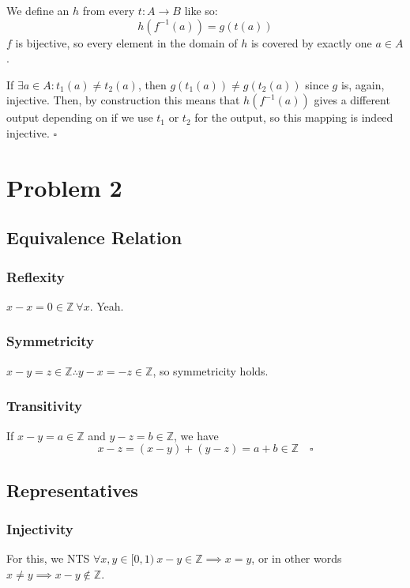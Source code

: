 \documentclass[12pt]{article}
\newcommand{\Z}{\mathbb{Z}}
\begin{document}
We define an $h$ from every $t: A \to B$ like so:
\[h\left(f^{-1}(a)\right)=g(t(a))\]
$f$ is bijective, so every element in the domain of $h$ is covered by exactly one $a \in A$.

If $\exists a \in A: t_1(a) \ne t_2(a)$, then
$g(t_1(a)) \ne g(t_2(a))$ since $g$ is, again, injective.
Then, by construction this means that $h\left(f^{-1}(a)\right)$
gives a different output depending on if we use $t_1$ or $t_2$ for the output,
so this mapping is indeed injective. $\square$

\pagebreak

\section{Problem 2}

\subsection{Equivalence Relation}

\subsubsection{Reflexity}

$x-x=0 \in \Z\ \forall x$. Yeah.

\subsubsection{Symmetricity}

$x-y=z \in \Z \therefore y-x=-z \in \Z$, so symmetricity holds.

\subsubsection{Transitivity}

If $x-y=a \in \Z$ and $y-z=b \in \Z$, we have
\[x-z=(x-y)+(y-z)=a+b \in \Z\quad\square\]

\subsection{Representatives}

\subsubsection{Injectivity}

For this, we NTS $\forall x, y \in [0, 1)\ x-y \in \Z \implies x=y$,
or in other words $x \ne y \implies x-y \notin \Z$.
\end{document}
